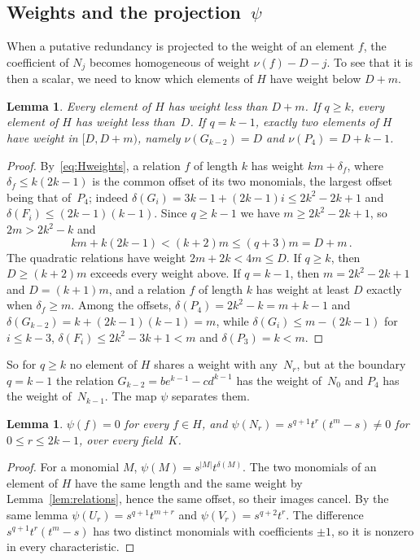 \documentclass[11pt,letterpaper]{article}
\numberwithin{equation}{section}
\theoremstyle{plain}
\newtheorem{lemma}[theorem]{Lemma}
\theoremstyle{remark}
\newcommand{\len}[1]{\lvert #1\rvert}
\begin{document}
\subsection{Weights and the projection~$\psi$}

When a putative redundancy is projected to the weight of an element $f$, the coefficient of $N_j$ becomes homogeneous of weight $\nu(f)-D-j$. To see that it is then a scalar, we need to know which elements of $H$ have weight below $D+m$.

\begin{lemma}\label{lem:Hweights}
Every element of $H$ has weight less than $D+m$. If $q\ge k$, every element of $H$ has weight less than~$D$. If $q=k-1$, exactly two elements of $H$ have weight in $[D,D+m)$, namely $\nu(G_{k-2})=D$ and $\nu(P_4)=D+k-1$.
\end{lemma}

\begin{proof}
By~\eqref{eq:Hweights}, a relation $f$ of length $k$ has weight $km+\delta_f$, where $\delta_f\le k(2k-1)$ is the common offset of its two monomials, the largest offset being that of~$P_4$; indeed $\delta(G_i)=3k-1+(2k-1)i\le 2k^2-2k+1$ and $\delta(F_i)\le(2k-1)(k-1)$. Since $q\ge k-1$ we have $m\ge 2k^2-2k+1$, so $2m>2k^2-k$ and
\begin{equation*}
km+k(2k-1)<(k+2)m\le(q+3)m=D+m\,.
\end{equation*}
The quadratic relations have weight $2m+2k<4m\le D$. If $q\ge k$, then $D\ge(k+2)m$ exceeds every weight above. If $q=k-1$, then $m=2k^2-2k+1$ and $D=(k+1)m$, and a relation $f$ of length $k$ has weight at least $D$ exactly when $\delta_f\ge m$. Among the offsets, $\delta(P_4)=2k^2-k=m+k-1$ and $\delta(G_{k-2})=k+(2k-1)(k-1)=m$, while $\delta(G_i)\le m-(2k-1)$ for $i\le k-3$, $\delta(F_i)\le 2k^2-3k+1<m$ and $\delta(P_3)=k<m$.
\end{proof}

So for $q\ge k$ no element of $H$ shares a weight with any~$N_r$, but at the boundary $q=k-1$ the relation $G_{k-2}=be^{k-1}-cd^{k-1}$ has the weight of~$N_0$ and $P_4$ has the weight of~$N_{k-1}$. The map $\psi$ separates them.

\begin{lemma}\label{lem:psi}
$\psi(f)=0$ for every $f\in H$, and $\psi(N_r)=s^{q+1}t^{r}(t^{m}-s)\ne 0$ for $0\le r\le 2k-1$, over every field~$K$.
\end{lemma}

\begin{proof}
For a monomial $M$, $\psi(M)=s^{\len{M}}t^{\delta(M)}$. The two monomials of an element of $H$ have the same length and the same weight by Lemma~\ref{lem:relations}, hence the same offset, so their images cancel. By the same lemma $\psi(U_r)=s^{q+1}t^{m+r}$ and $\psi(V_r)=s^{q+2}t^{r}$. The difference $s^{q+1}t^r(t^m-s)$ has two distinct monomials with coefficients $\pm1$, so it is nonzero in every characteristic.
\end{proof}
\end{document}
